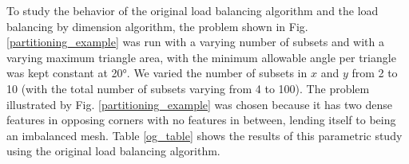\documentclass[letterpaper]{mandc2019}
\begin{document}
{To study the behavior of the original load balancing algorithm and the load balancing by dimension algorithm, the problem shown in Fig. \ref{partitioning_example} was run with a varying number of subsets and with a varying maximum triangle area, with the minimum allowable angle per triangle was kept constant at \ang{20}. We varied the number of subsets in $x$ and $y$ from 2 to 10 (with the total number of subsets varying from 4 to 100). The problem illustrated by Fig. \ref{partitioning_example} was chosen because it has two dense features in opposing corners with no features in between, lending itself to being an imbalanced mesh. Table \ref{og_table} shows the results of this parametric study using the original load balancing algorithm.
\begin{table}[htb]
\centering
  \caption{\bf The results of the parametric study using the original load balancing algorithm (left) and the load balancing by dimension algorithm (right).}
\end{table}}
\end{document}
